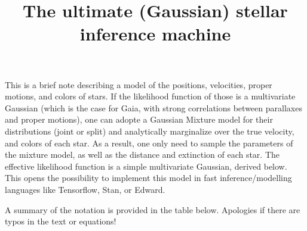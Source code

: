 \documentclass{article}
\begin{document}
 
\title{The ultimate (Gaussian) stellar inference machine}
 \date{}
 \author{}
 
\maketitle

This is a brief note describing a model of the positions, velocities, proper motions, and colors of stars. If the likelihood function of those is a multivariate Gaussian (which is the case for Gaia, with strong correlations between parallaxes and proper motions), one can adopte a Gaussian Mixture model for their distributions (joint or split) and analytically marginalize over the true velocity, and colors of each star. As a result, one only need to sample the parameters of the mixture model, as well as the distance and extinction of each star. The effective likelihood function is a simple multivariate Gaussian, derived below. This opens the possibility to implement this model in fast inference/modelling languages like Tensorflow, Stan, or Edward.

A summary of the notation is provided in the table below. Apologies if there are typos in the text or equations!
\end{document}
